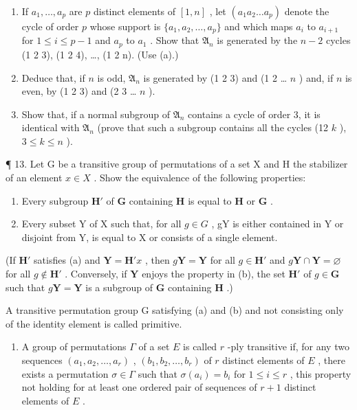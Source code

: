 \begin{enumerate}
\def\labelenumi{(\alph{enumi})}
\setcounter{enumi}{1}
\item
  If \(a_1, \ldots, a_p\) are \(p\) distinct elements of \([1, n]\) , let \((a_1 a_2 \ldots a_p)\) denote the cycle of order \(p\) whose support is \(\{a_1, a_2, \ldots, a_p\}\) and which maps \(a_i\) to \(a_{i+1}\) for \(1 \leqslant i \leqslant p-1\) and \(a_p\) to \(a_1\) . Show that \(\mathfrak{A}_n\) is generated by the \(n-2\) cycles (1 2 3), (1 2 4), \ldots, (1 2 n). (Use (a).)
\item
  Deduce that, if \(n\) is odd, \(\mathfrak{A}_n\) is generated by (1 2 3) and (1 2 \ldots{} \(n\) ) and, if \(n\) is even, by (1 2 3) and (2 3 \ldots{} \(n\) ).
\item
  Show that, if a normal subgroup of \(\mathfrak{A}_n\) contains a cycle of order 3, it is identical with \(\mathfrak{A}_n\) (prove that such a subgroup contains all the cycles (12 \(k\) ), \(3 \leqslant k \leqslant n\) ).
\end{enumerate}

¶ 13. Let G be a transitive group of permutations of a set X and H the stabilizer of an element \(x \in X\) . Show the equivalence of the following properties:

\begin{enumerate}
\def\labelenumi{(\alph{enumi})}
\item
  Every subgroup \(\mathbf{H}'\) of \(\mathbf{G}\) containing \(\mathbf{H}\) is equal to \(\mathbf{H}\) or \(\mathbf{G}\) .
\item
  Every subset Y of X such that, for all \(g \in G\) , gY is either contained in Y or disjoint from Y, is equal to X or consists of a single element.
\end{enumerate}

(If \(\mathbf{H}'\) satisfies (a) and \(\mathbf{Y} = \mathbf{H}'x\) , then \(g\mathbf{Y} = \mathbf{Y}\) for all \(g \in \mathbf{H}'\) and \(g\mathbf{Y} \cap \mathbf{Y} = \varnothing\) for all \(g \notin \mathbf{H}'\) . Conversely, if \(\mathbf{Y}\) enjoys the property in (b), the set \(\mathbf{H}'\) of \(g \in \mathbf{G}\) such that \(g\mathbf{Y} = \mathbf{Y}\) is a subgroup of \(\mathbf{G}\) containing \(\mathbf{H}\) .)

A transitive permutation group G satisfying (a) and (b) and not consisting only of the identity element is called primitive.

\begin{enumerate}
\def\labelenumi{\arabic{enumi}.}
\setcounter{enumi}{13}
\tightlist
\item
  A group of permutations \(\Gamma\) of a set \(E\) is called \(r\) -ply transitive if, for any two sequences \((a_1, a_2, \ldots, a_r)\) , \((b_1, b_2, \ldots, b_r)\) of \(r\) distinct elements of \(E\) , there exists a permutation \(\sigma \in \Gamma\) such that \(\sigma(a_i) = b_i\) for \(1 \leqslant i \leqslant r\) , this property not holding for at least one ordered pair of sequences of \(r + 1\) distinct elements of \(E\) .
\end{enumerate}

